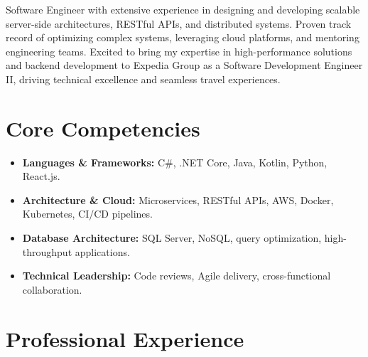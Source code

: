 \documentclass[11pt,a4paper,sans]{moderncv}
\begin{document}
\makecvtitle

\vspace{-15pt}
Software Engineer with extensive experience in designing and developing scalable server-side architectures, RESTful APIs, and distributed systems. Proven track record of optimizing complex systems, leveraging cloud platforms, and mentoring engineering teams. Excited to bring my expertise in high-performance solutions and backend development to Expedia Group as a Software Development Engineer II, driving technical excellence and seamless travel experiences.

\section{Core Competencies}
\vspace{1pt}
\begin{itemize}
\item \textbf{Languages \& Frameworks:} C\#, .NET Core, Java, Kotlin, Python, React.js.
\item \textbf{Architecture \& Cloud:} Microservices, RESTful APIs, AWS, Docker, Kubernetes, CI/CD pipelines.
\item \textbf{Database Architecture:} SQL Server, NoSQL, query optimization, high-throughput applications.
\item \textbf{Technical Leadership:} Code reviews, Agile delivery, cross-functional collaboration.
\end{itemize}

\section{Professional Experience}
\vspace{1pt}

\vspace{3pt}
\end{document}
